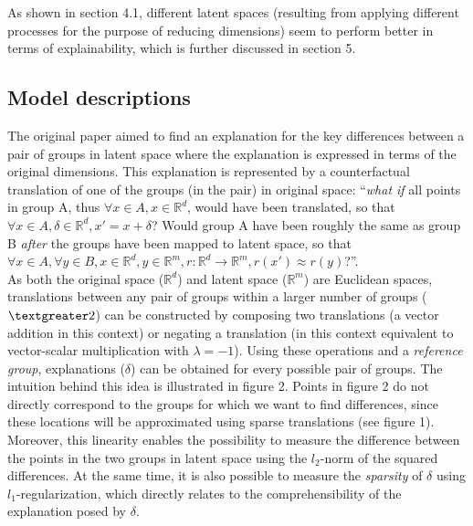 As shown in section 4.1, different latent spaces (resulting from applying different processes for the purpose of reducing dimensions) seem to perform better in terms of explainability, which is further discussed in section 5.


\subsection{Model descriptions}
The original paper aimed to find an explanation for the key differences between a pair of groups in latent space where the explanation is expressed in terms of the original dimensions. This explanation is represented by a counterfactual translation of one of the groups (in the pair) in original space: ``\textit{what if} all points in group A, thus $\forall x \in A, x \in \mathbb{R}^d$, would have been translated, so that $\forall x \in A, \delta \in \mathbb{R}^d, x' = x + \delta$? Would group A have been roughly the same as group B \textit{after} the groups have been mapped to latent space, so that $\forall x \in A, \forall y \in B, x \in \mathbb{R}^d, y \in \mathbb{R}^m, r: \mathbb{R}^d \to \mathbb{R}^m, r(x') \approx r(y)$?''.\\

As both the original space ($\mathbb{R}^d$) and latent space ($\mathbb{R}^m$) are Euclidean spaces, translations between any pair of groups within a larger number of groups ($\textgreater 2$) can be constructed by composing two translations (a vector addition in this context) or negating a translation (in this context equivalent to vector-scalar multiplication with $\lambda = -1$). Using these operations and a \textit{reference group}, explanations ($\delta$) can be obtained for every possible pair of groups. The intuition behind this idea is illustrated in figure 2. Points in figure 2 do not directly correspond to the groups for which we want to find differences, since these locations will be approximated using sparse translations (see figure 1). Moreover, this linearity enables the possibility to measure the difference between the points in the two groups in latent space using the $l_2$-norm of the squared differences. At the same time, it is also possible to measure the \textit{sparsity} of $\delta$ using $l_1$-regularization, which directly relates to the comprehensibility of the explanation posed by $\delta$.\\

